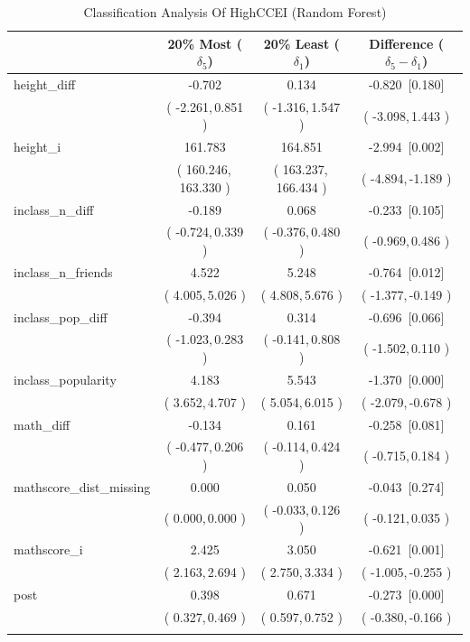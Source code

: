 \documentclass[11 pt]{article}
\begin{document}
\begin{table}[H]
\centering
\footnotesize
\begin{threeparttable}
\caption{Classification Analysis Of HighCCEI (Random Forest)}\label{tab:clan_clb_rf}
\begin{tabular}{lccc}
\toprule \hline
 & 20\% Most ($\delta_5$) & 20\% Least ($\delta_1$) & Difference ($\delta_5-\delta_1$) \\
\midrule
height\_diff & -0.702 & 0.134 & -0.820 \,[0.180] \\
& ( -2.261,\,0.851 ) & ( -1.316,\,1.547 ) & ( -3.098,\,1.443 ) \\
\addlinespace
height\_i & 161.783 & 164.851 & -2.994 \,[0.002] \\
& ( 160.246,\,163.330 ) & ( 163.237,\,166.434 ) & ( -4.894,\,-1.189 ) \\
\addlinespace
inclass\_n\_diff & -0.189 & 0.068 & -0.233 \,[0.105] \\
& ( -0.724,\,0.339 ) & ( -0.376,\,0.480 ) & ( -0.969,\,0.486 ) \\
\addlinespace
inclass\_n\_friends & 4.522 & 5.248 & -0.764 \,[0.012] \\
& ( 4.005,\,5.026 ) & ( 4.808,\,5.676 ) & ( -1.377,\,-0.149 ) \\
\addlinespace
inclass\_pop\_diff & -0.394 & 0.314 & -0.696 \,[0.066] \\
& ( -1.023,\,0.283 ) & ( -0.141,\,0.808 ) & ( -1.502,\,0.110 ) \\
\addlinespace
inclass\_popularity & 4.183 & 5.543 & -1.370 \,[0.000] \\
& ( 3.652,\,4.707 ) & ( 5.054,\,6.015 ) & ( -2.079,\,-0.678 ) \\
\addlinespace
math\_diff & -0.134 & 0.161 & -0.258 \,[0.081] \\
& ( -0.477,\,0.206 ) & ( -0.114,\,0.424 ) & ( -0.715,\,0.184 ) \\
\addlinespace
mathscore\_dist\_missing & 0.000 & 0.050 & -0.043 \,[0.274] \\
& ( 0.000,\,0.000 ) & ( -0.033,\,0.126 ) & ( -0.121,\,0.035 ) \\
\addlinespace
mathscore\_i & 2.425 & 3.050 & -0.621 \,[0.001] \\
& ( 2.163,\,2.694 ) & ( 2.750,\,3.334 ) & ( -1.005,\,-0.255 ) \\
\addlinespace
post & 0.398 & 0.671 & -0.273 \,[0.000] \\
& ( 0.327,\,0.469 ) & ( 0.597,\,0.752 ) & ( -0.380,\,-0.166 ) \\
\addlinespace
\hline \bottomrule

\end{tabular}
\end{threeparttable}
\end{table}
\end{document}
